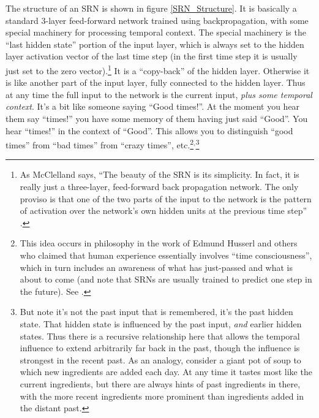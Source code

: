 The structure of an SRN is shown in figure \ref{SRN_Structure}. It is basically a standard 3-layer feed-forward network trained using backpropagation, with some special machinery for processing temporal context. The special machinery is the ``last hidden state'' portion of the input layer, which is always set to the hidden layer activation vector of the last time step (in the first time step it is usually just set to the zero vector).\footnote{ As McClelland says, ``The beauty of the SRN is its simplicity. In fact, it is really just a three-layer, feed-forward back propagation network. The only proviso is that one of the two parts of the input to the network is the pattern of activation over the network's own hidden units at the previous time step'' .} It is a ``copy-back'' of the hidden  layer. Otherwise it is like another part of the input layer, fully connected to the hidden layer. Thus at any time the full input to the network is the current input, \emph{plus some temporal context}. It's a bit like  someone saying ``Good times!''. At the moment you hear them say ``times!'' you have some memory of them having just said ``Good''. You  hear ``times!'' in the context of ``Good''. This allows you to distinguish ``good times'' from ``bad times'' from ``crazy times'', etc.\footnote{This idea occurs in philosophy in the work of Edmund Husserl and others who claimed that human experience essentially involves ``time consciousness'', which in turn includes an awareness of what has just-passed and what is about to come (and note that SRNs are usually trained to predict one step in the future). See .}$^,$\footnote{But note it's not the past input that is remembered, it's the past hidden state. That hidden state is influenced by the past input, \emph{and} earlier hidden states. Thus there is a recursive relationship here that allows the temporal influence to extend arbitrarily far back in the past, though the influence is strongest in the recent past. As an analogy, consider a giant pot of soup to which new ingredients are added each day. At any time it tastes most like the current ingredients, but there are always hints of past ingredients in there, with the more recent ingredients more prominent than ingredients added in the distant past.}

